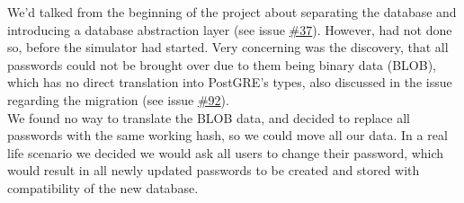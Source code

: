 We'd talked from the beginning of the project about separating the database and introducing a database abstraction layer (see issue \href{https://github.com/DevelOpsITU/MiniTwit/issues/37}{\#37}). However, had not done so, before the simulator had started. %
Very concerning was the discovery, that all passwords could not be brought over due to them being binary data (BLOB), which has no direct translation into PostGRE's types, also discussed in the issue regarding the migration (see issue \href{https://github.com/DevelOpsITU/MiniTwit/issues/92}{\#92}). \\

We found no way to translate the BLOB data, and decided to replace all passwords with the same working hash, so we could move all our data. In a real life scenario we decided we would ask all users to change their password, which would result in all newly updated passwords to be created and stored with compatibility of the new database. \\ %


